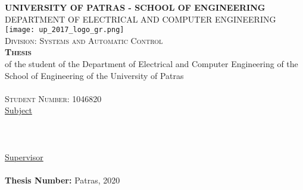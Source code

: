 \begin{titlepage}
\begin{center}
\textsc{\textbf{\large UNIVERSITY OF PATRAS - SCHOOL OF ENGINEERING}\\
\large DEPARTMENT OF ELECTRICAL AND COMPUTER ENGINEERING}\\

\texttt{[image: up\_2017\_logo\_gr.png]}\\  

\textsc{Division: \large Systems and Automatic Control}\\[1cm]

\textsc{\textbf{\LARGE{Thesis}}}\\ [0.5cm]
of the student of the Department of Electrical and Computer Engineering of the School of Engineering of the University of Patras\\[0.5cm]

\textsc{\Large \me }\\[0.5cm]
\textsc{\large Student Number: 1046820}\\[1cm]

\underline{\large Subject}\\
\HRule \\[0.4cm]
{\huge \bfseries \thesistitle }\\[0.4cm] %
\HRule \\[1.5cm]

\underline{\large Supervisor}\\[0.5cm]
\large \suptitle \, \supname \\[1cm]
\textbf{Thesis Number:}
\vfill
\large{Patras, 2020}
\end{center}
\end{titlepage}




